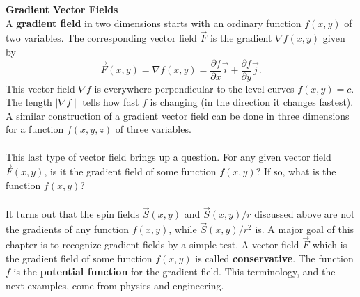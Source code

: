 \noindent\textbf{\large Gradient Vector Fields}\\

\noindent A \textbf{gradient field} in two dimensions starts with an ordinary function $f(x, y)$ of two variables. The corresponding vector field $\vec F$ is the gradient $\nabla f(x,y)$ given by
$$\vec F(x,y) = \nabla f(x,y) = \dfrac{\partial f}{\partial x} \vec i + \dfrac{\partial f}{\partial y} \vec j.$$ 
This vector field $\nabla f$ is everywhere perpendicular to the level curves $f(x, y) = c$. The
length $\mid \nabla f \mid$ tells how fast $f$ is changing (in the direction it changes fastest). A similar construction of a gradient vector field can be done in three dimensions for a function $f(x,y,z)$ of three variables.\\

\\

This last type of vector field brings up a question. For any given vector field $\vec F(x,y)$, is it the gradient field of some function $f(x,y)$? If so, what is the function $f(x,y)$?\\

\\

It turns out that the spin fields $\vec S(x,y)$ and $\vec S(x,y)/r$ discussed above are not the gradients of any function $f(x,y)$, while $\vec S(x,y)/r^2$ is. A major goal of this chapter is to recognize gradient fields by a simple test. A vector field $\vec F$ which is the gradient field of some function $f(x,y)$ is called \textbf{conservative}. The function $f$ is the \textbf{potential function} for the gradient field. This terminology, and the next examples, come from physics and engineering.\\


